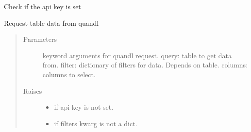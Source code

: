 \documentclass[letterpaper,10pt,english]{sphinxmanual}
\begin{document}
\begin{fulllineitems}

\begin{fulllineitems}
\label{\detokenize{dalio.external:dalio.external.web.QuandlAPI.check}}
Check if the api key is set

\end{fulllineitems}


\begin{fulllineitems}
\label{\detokenize{dalio.external:dalio.external.web.QuandlAPI.request}}
Request table data from quandl
\begin{quote}\begin{description}
\item[{Parameters}] \leavevmode
{} \textendash{} keyword arguments for quandl request.
query: table to get data from.
filter: dictionary of filters for data. Depends on table.
columns: columns to select.

\item[{Raises}] \leavevmode\begin{itemize}
\item {} 
 \textendash{} if api key is not set.

\item {} 
 \textendash{} if filters kwarg is not a dict.

\end{itemize}

\end{description}\end{quote}

\end{fulllineitems}


\end{fulllineitems}

\end{document}
